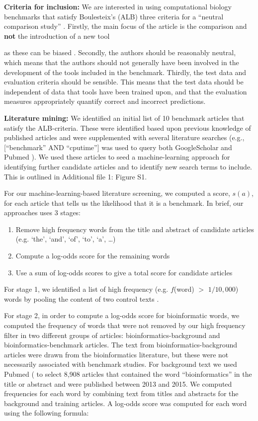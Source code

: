 \documentclass{bmcart}
\begin{document}
\textbf{Criteria for inclusion:} We are interested in using
computational biology benchmarks that satisfy Boulesteix’s
(ALB) three criteria for a ``neutral comparison study''
\cite{Boulesteix2013-vb}. Firstly, the main focus of the article is
the comparison and \textbf{not} the introduction of a new
tool {{\color{red}as these can be biased} \cite{Buchka:2021a}. Secondly, the authors should be reasonably neutral, which means
that the authors should not generally have been involved in the
development of the tools included in the benchmark. Thirdly, the test
data and evaluation criteria should be sensible. This means that the
test data should be independent of data that tools have been trained
upon, and that the evaluation measures appropriately quantify correct
and incorrect predictions.

\textbf{Literature mining:} We identified an initial list of 10 benchmark
articles that satisfy the ALB-criteria. These were identified based
upon previous knowledge of published articles and were supplemented
with several literature searches (e.g., [``benchmark'' AND ``cputime''] was
used to query both GoogleScholar and Pubmed
\cite{Sayers2010-vm,McEntyre2001-fl}). We used these articles to seed
a machine-learning approach for identifying further candidate articles
and to identify new search terms to include. {\color{red}This is outlined in Additional file 1: Figure S1. }

For our machine-learning-based literature screening, we computed a
score, $s(a)$, for each article that tells us the likelihood that it
is a benchmark. In brief, our approaches uses 3 stages:
\begin{enumerate}
\item Remove high frequency words from the title and abstract of candidate articles (e.g. ‘the’, ‘and’, ‘of’, ‘to’, ‘a’, …) 
\item Compute a log-odds score for the remaining words 
\item Use a sum of log-odds scores to give a total score for candidate articles
\end{enumerate}
For stage 1, we identified a list of high frequency (e.g. $f$(word) $>$
$1/10,000$) words by pooling the content of two control texts
\cite{Carroll1865-hk,Tolkien1937-ke}.

For stage 2, in order to compute a log-odds score for bioinformatic
words, we computed the frequency of words that were not removed by our
high frequency filter in two different groups of articles:
bioinformatics-background and bioinformatics-benchmark articles. The
text from bioinformatics-background articles were drawn from the
bioinformatics literature, but these were not necessarily associated
with benchmark studies. For background text we used Pubmed
(\cite{Sayers2010-vm,McEntyre2001-fl} to select 8,908 articles that
contained the word “bioinformatics” in the title or abstract and were
published between 2013 and 2015. We computed frequencies for each word
by combining text from titles and abstracts for the background and
training articles. A log-odds score was computed for each word using
the following formula:

}
\end{document}
